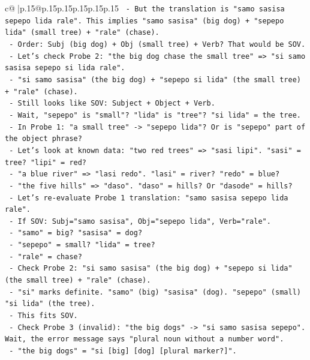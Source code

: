 \documentclass{article}
\begin{document}
{\begin{supertabular}{c@{$\;$}|p{.15\linewidth}@{}p{.15\linewidth}p{.15\linewidth}p{.15\linewidth}p{.15\linewidth}p{.15\linewidth}}
{{{\texttt{       {-} But the translation is "samo sasisa sepepo lida rale". This implies "samo sasisa" (big dog) + "sepepo lida" (small tree) + "rale" (chase).} \\
\texttt{       {-} Order: Subj (big dog) + Obj (small tree) + Verb? That would be SOV.} \\
\texttt{       {-} Let's check Probe 2: "the big dog chase the small tree" => "si samo sasisa sepepo si lida rale".} \\
\texttt{         {-} "si samo sasisa" (the big dog) + "sepepo si lida" (the small tree) + "rale" (chase).} \\
\texttt{         {-} Still looks like SOV: Subject + Object + Verb.} \\
\texttt{         {-} Wait, "sepepo" is "small"? "lida" is "tree"? "si lida" = the tree.} \\
\texttt{         {-} In Probe 1: "a small tree" {-}> "sepepo lida"? Or is "sepepo" part of the object phrase?} \\
\texttt{         {-} Let's look at known data: "two red trees" => "sasi lipi". "sasi" = tree? "lipi" = red?} \\
\texttt{         {-} "a blue river" => "lasi redo". "lasi" = river? "redo" = blue?} \\
\texttt{         {-} "the five hills" => "daso". "daso" = hills? Or "dasode" = hills?} \\
\texttt{         {-} Let's re{-}evaluate Probe 1 translation: "samo sasisa sepepo lida rale".} \\
\texttt{           {-} If SOV: Subj="samo sasisa", Obj="sepepo lida", Verb="rale".} \\
\texttt{           {-} "samo" = big? "sasisa" = dog?} \\
\texttt{           {-} "sepepo" = small? "lida" = tree?} \\
\texttt{           {-} "rale" = chase?} \\
\texttt{         {-} Check Probe 2: "si samo sasisa" (the big dog) + "sepepo si lida" (the small tree) + "rale" (chase).} \\
\texttt{           {-} "si" marks definite. "samo" (big) "sasisa" (dog). "sepepo" (small) "si lida" (the tree).} \\
\texttt{           {-} This fits SOV.} \\
\texttt{         {-} Check Probe 3 (invalid): "the big dogs" {-}> "si samo sasisa sepepo". Wait, the error message says "plural noun without a number word".} \\
\texttt{           {-} "the big dogs" = "si {[}big{]} {[}dog{]} {[}plural marker?{]}".} \\
}}}
\end{supertabular}}
\end{document}
